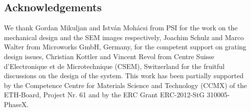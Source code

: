 \documentclass[a0,portrait]{a0poster}
\begin{document}
\begin{multicols}{2}

\section*{Acknowledgements}

We thank Gordan Mikuljan and István Mohácsi from PSI for the
work on the mechanical design and the SEM images
respectively, Joachim Schulz and Marco Walter from
Microworks GmbH, Germany, for the competent support on grating design
issues, Christian Kottler and Vincent Revol from Centre Suisse
d'Electronique et de Microtechnique (CSEM), Switzerland for the fruitful
discussions on the design of the system. This work has been partially
supported by the Competence Centre for Materials Science and Technology
(CCMX) of the ETH-Board, Project Nr. 61 and by the ERC Grant ERC-2012-StG 310005-PhaseX.

\end{multicols}
\end{document}
